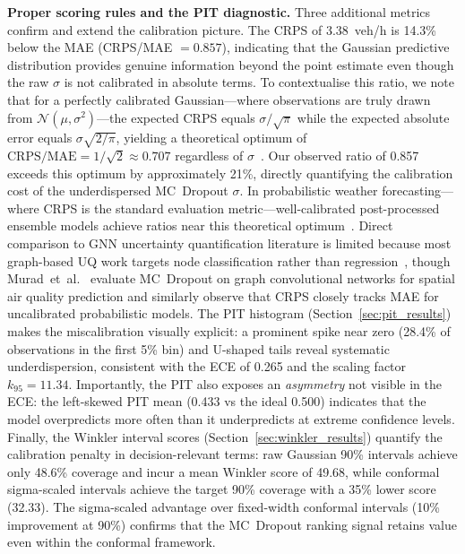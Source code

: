 \textbf{Proper scoring rules and the PIT diagnostic.} Three additional metrics confirm and extend the calibration picture. The CRPS of 3.38~veh/h is 14.3\% below the MAE (CRPS/MAE $= 0.857$), indicating that the Gaussian predictive distribution provides genuine information beyond the point estimate even though the raw $\sigma$ is not calibrated in absolute terms. To contextualise this ratio, we note that for a perfectly calibrated Gaussian---where observations are truly drawn from $\mathcal{N}(\mu, \sigma^2)$---the expected CRPS equals $\sigma/\sqrt{\pi}$ while the expected absolute error equals $\sigma\sqrt{2/\pi}$, yielding a theoretical optimum of $\text{CRPS}/\text{MAE} = 1/\sqrt{2} \approx 0.707$ regardless of $\sigma$~\cite{gneiting2007strictly}. Our observed ratio of 0.857 exceeds this optimum by approximately 21\%, directly quantifying the calibration cost of the underdispersed MC~Dropout $\sigma$. In probabilistic weather forecasting---where CRPS is the standard evaluation metric---well-calibrated post-processed ensemble models achieve ratios near this theoretical optimum~\cite{gneiting2005calibrated}. Direct comparison to GNN uncertainty quantification literature is limited because most graph-based UQ work targets node classification rather than regression~\cite{fuchsgruber2024energy}, though Murad~et~al.~\cite{murad2021probabilistic} evaluate MC~Dropout on graph convolutional networks for spatial air quality prediction and similarly observe that CRPS closely tracks MAE for uncalibrated probabilistic models. The PIT histogram (Section~\ref{sec:pit_results}) makes the miscalibration visually explicit: a prominent spike near zero (28.4\% of observations in the first 5\% bin) and U-shaped tails reveal systematic underdispersion, consistent with the ECE of 0.265 and the scaling factor $k_{95} = 11.34$. Importantly, the PIT also exposes an \emph{asymmetry} not visible in the ECE: the left-skewed PIT mean (0.433 vs the ideal 0.500) indicates that the model overpredicts more often than it underpredicts at extreme confidence levels. Finally, the Winkler interval scores (Section~\ref{sec:winkler_results}) quantify the calibration penalty in decision-relevant terms: raw Gaussian 90\% intervals achieve only 48.6\% coverage and incur a mean Winkler score of 49.68, while conformal sigma-scaled intervals achieve the target 90\% coverage with a 35\% lower score (32.33). The sigma-scaled advantage over fixed-width conformal intervals (10\% improvement at 90\%) confirms that the MC~Dropout ranking signal retains value even within the conformal framework.

